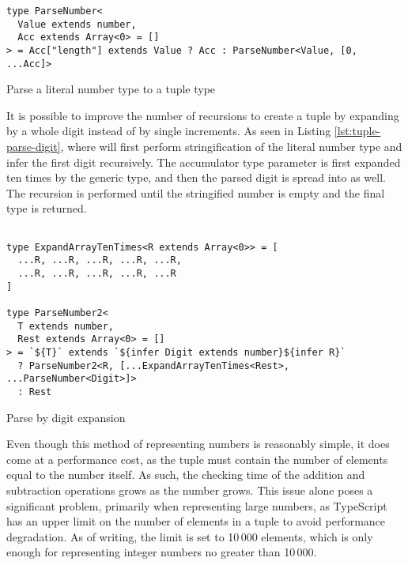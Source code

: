 \begin{listing}[ht]
  \begin{verbatim}
type ParseNumber<
  Value extends number,
  Acc extends Array<0> = []
> = Acc["length"] extends Value ? Acc : ParseNumber<Value, [0, ...Acc]>
\end{verbatim}
  \caption{Parse a literal number type to a tuple type}\label{lst:tuple-parse}
\end{listing}

It is possible to improve the number of recursions to create a tuple by expanding by a whole digit instead of by single increments. As seen in Listing \ref{lst:tuple-parse-digit}, where  will first perform stringification of the literal number type  and infer the first digit recursively. The accumulator type parameter  is first expanded ten times by the  generic type, and then the parsed digit is spread into  as well. The recursion is performed until the stringified number is empty and the final  type is returned.

\begin{listing}[ht]
  \begin{verbatim}

type ExpandArrayTenTimes<R extends Array<0>> = [
  ...R, ...R, ...R, ...R, ...R,
  ...R, ...R, ...R, ...R, ...R
]
    
type ParseNumber2<
  T extends number,
  Rest extends Array<0> = []
> = `${T}` extends `${infer Digit extends number}${infer R}`
  ? ParseNumber2<R, [...ExpandArrayTenTimes<Rest>, ...ParseNumber<Digit>]>
  : Rest
\end{verbatim}
  \caption{Parse by digit expansion}\label{lst:tuple-parse-digit}
\end{listing}

Even though this method of representing numbers is reasonably simple, it does come at a performance cost, as the tuple must contain the number of elements equal to the number itself. As such, the checking time of the addition and subtraction operations grows as the number grows. This issue alone poses a significant problem, primarily when representing large numbers, as TypeScript has an upper limit on the number of elements in a tuple to avoid performance degradation. As of writing, the limit is set to 10\,000 elements\cite{ImplementationCheckerTs2023}, which is only enough for representing integer numbers no greater than 10\,000.

